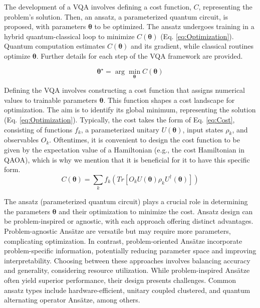 The development of a VQA involves defining a cost function, \( C \), representing the problem's solution. Then, an ansatz, a parameterized quantum circuit, is proposed, with parameters \(\boldsymbol{\theta}\) to be optimized. The ansatz undergoes training in a hybrid quantum-classical loop to minimize \( C(\boldsymbol{\theta}) \) (Eq. \ref{eq:Optimization}). Quantum computation estimates \( C(\boldsymbol{\theta}) \) and its gradient, while classical routines optimize \(\boldsymbol{\theta}\). Further details for each step of the VQA framework are provided.

\begin{equation}\label{eq:Optimization}
\boldsymbol{\theta}^{\star} = \arg \min_{\boldsymbol{\theta}} C(\boldsymbol{\theta})
\end{equation}

 Defining the VQA involves constructing a cost function that assigns numerical values to trainable parameters \(\boldsymbol{\theta}\). This function shapes a cost landscape for optimization. The aim is to identify its global minimum, representing the solution (Eq. \ref{eq:Optimization}). Typically, the cost takes the form of Eq. \ref{eq:Cost}, consisting of functions \(f_k\), a parameterized unitary \(U(\boldsymbol{\theta})\), input states \(\rho_k\), and observables \(O_k\). Oftentimes, it is convenient to design the cost function to be given by the expectation value of a Hamiltonian (e.g., the cost Hamiltonian in QAOA), which is why we mention that it is beneficial for it to have this specific form.
\begin{equation}\label{eq:Cost}
C(\boldsymbol{\theta}) = \sum_k f_k\left( Tr\left[O_k U(\boldsymbol{\theta}) \rho_k U^{\dagger}(\boldsymbol{\theta})\right] \right)
\end{equation}


 The ansatz (parameterized quantum circuit) plays a crucial role in determining the parameters $\boldsymbol{\theta}$ and their optimization to minimize the cost. Ansatz design can be problem-inspired or agnostic, with each approach offering distinct advantages. Problem-agnostic Ansätze are versatile but may require more parameters, complicating optimization. In contrast, problem-oriented Ansätze incorporate problem-specific information, potentially reducing parameter space and improving interpretability. Choosing between these approaches involves balancing accuracy and generality, considering resource utilization. While problem-inspired Ansätze often yield superior performance, their design presents challenges. Common ansatz types include hardware-efficient, unitary coupled clustered, and quantum alternating operator Ansätze, among others. \\

